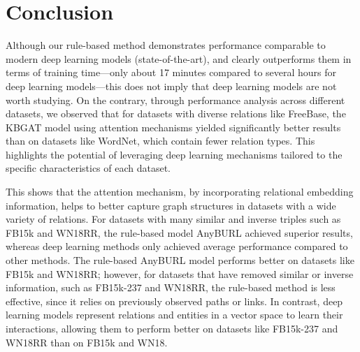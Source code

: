 \section{Conclusion}
\label{chap:Conclusion}

%

Although our rule-based method demonstrates performance comparable to modern deep learning models (state-of-the-art), and clearly outperforms them in terms of training time—only about 17 minutes compared to several hours for deep learning models—this does not imply that deep learning models are not worth studying. On the contrary, through performance analysis across different datasets, we observed that for datasets with diverse relations like FreeBase, the KBGAT model using attention mechanisms yielded significantly better results than on datasets like WordNet, which contain fewer relation types. This highlights the potential of leveraging deep learning mechanisms tailored to the specific characteristics of each dataset.

This shows that the attention mechanism, by incorporating relational embedding information, helps to better capture graph structures in datasets with a wide variety of relations.  
For datasets with many similar and inverse triples such as FB15k and WN18RR, the rule-based model AnyBURL achieved superior results, whereas deep learning methods only achieved average performance compared to other methods.  
The rule-based AnyBURL model performs better on datasets like FB15k and WN18RR; however, for datasets that have removed similar or inverse information, such as FB15k-237 and WN18RR, the rule-based method is less effective, since it relies on previously observed paths or links. In contrast, deep learning models represent relations and entities in a vector space to learn their interactions, allowing them to perform better on datasets like FB15k-237 and WN18RR than on FB15k and WN18.

